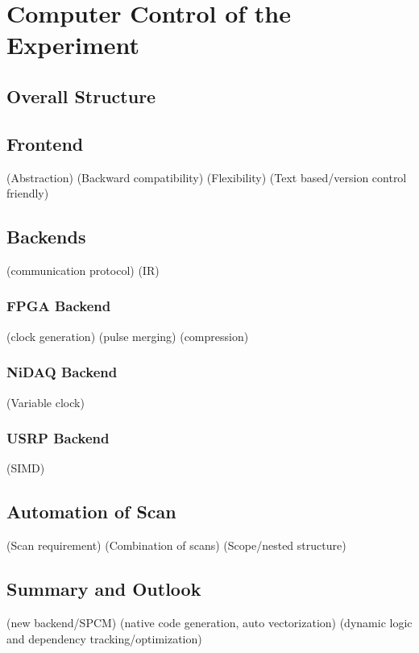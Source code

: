 
\chapter{Computer Control of the Experiment}
\label{ch:computer-control}

\section{Overall Structure}

\section{Frontend}
(Abstraction)
(Backward compatibility)
(Flexibility)
(Text based/version control friendly)

\section{Backends}
(communication protocol)
(IR)

\subsection{FPGA Backend}
(clock generation)
(pulse merging)
(compression)

\subsection{NiDAQ Backend}
(Variable clock)

\subsection{USRP Backend}
(SIMD)

\section{Automation of Scan}
(Scan requirement)
(Combination of scans)
(Scope/nested structure)

\section{Summary and Outlook}
(new backend/SPCM)
(native code generation, auto vectorization)
(dynamic logic and dependency tracking/optimization)

